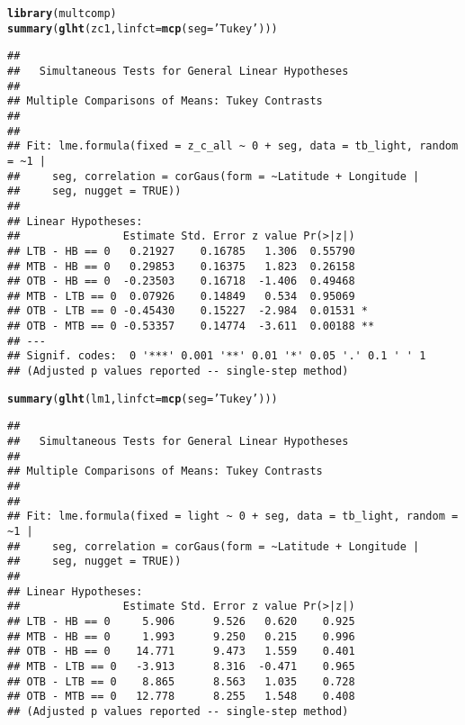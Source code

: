 \documentclass[letterpaper,12pt]{article}\usepackage[]{graphicx}\usepackage[]{color}
\makeatletter
\newcommand{\hlstr}[1]{\textcolor[rgb]{0.192,0.494,0.8}{#1}}%
\newcommand{\hlstd}[1]{\textcolor[rgb]{0.345,0.345,0.345}{#1}}%
\newcommand{\hlkwc}[1]{\textcolor[rgb]{0.333,0.667,0.333}{#1}}%
\newcommand{\hlkwd}[1]{\textcolor[rgb]{0.737,0.353,0.396}{\textbf{#1}}}%
\newenvironment{kframe}{%
 \def\at@end@of@kframe{}%
 \ifinner\ifhmode%
  \def\at@end@of@kframe{\end{minipage}}%
  \begin{minipage}{\columnwidth}%
 \fi\fi%
 \def\FrameCommand##1{\hskip\@totalleftmargin \hskip-\fboxsep
 \colorbox{shadecolor}{##1}\hskip-\fboxsep
     \hskip-\linewidth \hskip-\@totalleftmargin \hskip\columnwidth}%
 \MakeFramed {\advance\hsize-\width
   \@totalleftmargin\z@ \linewidth\hsize
   \@setminipage}}%
 {\par\unskip\endMakeFramed%
 \at@end@of@kframe}
\newenvironment{knitrout}{}{} %
\makeatother
\begin{document}
\clearpage
\begin{knitrout}
\color{fgcolor}\begin{kframe}
\begin{alltt}
\hlkwd{library}\hlstd{(multcomp)}
\hlkwd{summary}\hlstd{(}\hlkwd{glht}\hlstd{(zc1,} \hlkwc{linfct} \hlstd{=} \hlkwd{mcp}\hlstd{(}\hlkwc{seg} \hlstd{=} \hlstr{'Tukey'}\hlstd{)))}
\end{alltt}
\begin{verbatim}
## 
## 	 Simultaneous Tests for General Linear Hypotheses
## 
## Multiple Comparisons of Means: Tukey Contrasts
## 
## 
## Fit: lme.formula(fixed = z_c_all ~ 0 + seg, data = tb_light, random = ~1 | 
##     seg, correlation = corGaus(form = ~Latitude + Longitude | 
##     seg, nugget = TRUE))
## 
## Linear Hypotheses:
##                Estimate Std. Error z value Pr(>|z|)   
## LTB - HB == 0   0.21927    0.16785   1.306  0.55790   
## MTB - HB == 0   0.29853    0.16375   1.823  0.26158   
## OTB - HB == 0  -0.23503    0.16718  -1.406  0.49468   
## MTB - LTB == 0  0.07926    0.14849   0.534  0.95069   
## OTB - LTB == 0 -0.45430    0.15227  -2.984  0.01531 * 
## OTB - MTB == 0 -0.53357    0.14774  -3.611  0.00188 **
## ---
## Signif. codes:  0 '***' 0.001 '**' 0.01 '*' 0.05 '.' 0.1 ' ' 1
## (Adjusted p values reported -- single-step method)
\end{verbatim}
\begin{alltt}
\hlkwd{summary}\hlstd{(}\hlkwd{glht}\hlstd{(lm1,} \hlkwc{linfct} \hlstd{=} \hlkwd{mcp}\hlstd{(}\hlkwc{seg} \hlstd{=} \hlstr{'Tukey'}\hlstd{)))}
\end{alltt}
\begin{verbatim}
## 
## 	 Simultaneous Tests for General Linear Hypotheses
## 
## Multiple Comparisons of Means: Tukey Contrasts
## 
## 
## Fit: lme.formula(fixed = light ~ 0 + seg, data = tb_light, random = ~1 | 
##     seg, correlation = corGaus(form = ~Latitude + Longitude | 
##     seg, nugget = TRUE))
## 
## Linear Hypotheses:
##                Estimate Std. Error z value Pr(>|z|)
## LTB - HB == 0     5.906      9.526   0.620    0.925
## MTB - HB == 0     1.993      9.250   0.215    0.996
## OTB - HB == 0    14.771      9.473   1.559    0.401
## MTB - LTB == 0   -3.913      8.316  -0.471    0.965
## OTB - LTB == 0    8.865      8.563   1.035    0.728
## OTB - MTB == 0   12.778      8.255   1.548    0.408
## (Adjusted p values reported -- single-step method)
\end{verbatim}
\begin{alltt}

\end{alltt}
\end{kframe}
\end{knitrout}
\end{document}

